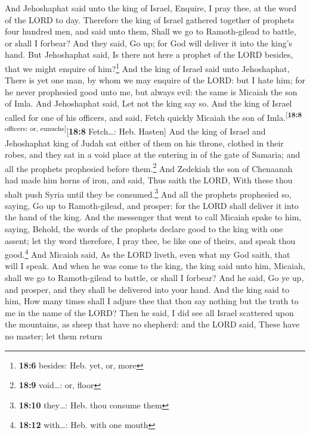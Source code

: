  And Jehoshaphat said unto the king of Israel, Enquire, I
pray thee, at the word of the LORD to day.  Therefore the
king of Israel gathered together of prophets four hundred men, and said
unto them, Shall we go to Ramoth-gilead to battle, or shall I forbear?
And they said, Go up; for God will deliver it into the king's hand.
 But Jehoshaphat said, Is there not here a prophet of the
LORD besides, that we might enquire of him?\footnote{\textbf{18:6}
  besides: Heb. yet, or, more}  And the king of Israel
said unto Jehoshaphat, There is yet one man, by whom we may enquire of
the LORD: but I hate him; for he never prophesied good unto me, but
always evil: the same is Micaiah the son of Imla. And Jehoshaphat said,
Let not the king say so.  And the king of Israel called
for one of his officers, and said, Fetch quickly Micaiah the son of
Imla.\textsuperscript{{[}\textbf{18:8} officers: or,
eunuchs{]}}{[}\textbf{18:8} Fetch\ldots: Heb. Hasten{]} 
And the king of Israel and Jehoshaphat king of Judah sat either of them
on his throne, clothed in their robes, and they sat in a void place at
the entering in of the gate of Samaria; and all the prophets prophesied
before them.\footnote{\textbf{18:9} void\ldots: or, floor}
 And Zedekiah the son of Chenaanah had made him horns of
iron, and said, Thus saith the LORD, With these thou shalt push Syria
until they be consumed.\footnote{\textbf{18:10} they\ldots: Heb. thou
  consume them}  And all the prophets prophesied so,
saying, Go up to Ramoth-gilead, and prosper: for the LORD shall deliver
it into the hand of the king.  And the messenger that
went to call Micaiah spake to him, saying, Behold, the words of the
prophets declare good to the king with one assent; let thy word
therefore, I pray thee, be like one of theirs, and speak thou
good.\footnote{\textbf{18:12} with\ldots: Heb. with one mouth}
 And Micaiah said, As the LORD liveth, even what my God
saith, that will I speak.  And when he was come to the
king, the king said unto him, Micaiah, shall we go to Ramoth-gilead to
battle, or shall I forbear? And he said, Go ye up, and prosper, and they
shall be delivered into your hand.  And the king said to
him, How many times shall I adjure thee that thou say nothing but the
truth to me in the name of the LORD?  Then he said, I did
see all Israel scattered upon the mountains, as sheep that have no
shepherd: and the LORD said, These have no master; let them return
